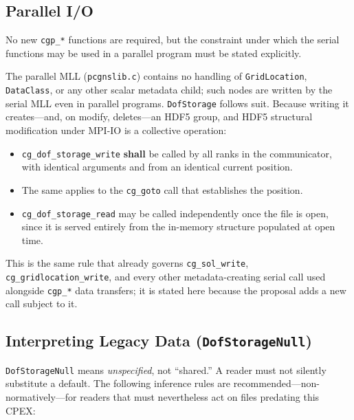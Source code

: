 \documentclass[11pt,letterpaper]{article}
\begin{document}
\subsection{Parallel I/O}

No new \texttt{cgp\_*} functions are required, but the constraint under
which the serial functions may be used in a parallel program must be
stated explicitly.

The parallel MLL (\texttt{pcgnslib.c}) contains no handling of
\texttt{GridLocation}, \texttt{DataClass}, or any other scalar metadata
child; such nodes are written by the serial MLL even in parallel
programs.  \texttt{DofStorage} follows suit.  Because writing it
creates---and, on modify, deletes---an HDF5 group, and HDF5 structural
modification under MPI-IO is a collective operation:

\begin{itemize}[leftmargin=2em]
\item \texttt{cg\_dof\_storage\_write} \textbf{shall} be called by all
  ranks in the communicator, with identical arguments and from an
  identical current position.
\item The same applies to the \texttt{cg\_goto} call that establishes
  the position.
\item \texttt{cg\_dof\_storage\_read} may be called independently once
  the file is open, since it is served entirely from the in-memory
  structure populated at open time.
\end{itemize}

This is the same rule that already governs \texttt{cg\_sol\_write},
\texttt{cg\_gridlocation\_write}, and every other metadata-creating
serial call used alongside \texttt{cgp\_*} data transfers; it is stated
here because the proposal adds a new call subject to it.

\subsection{Interpreting Legacy Data (\texttt{DofStorageNull})}
\label{sec:legacy-inference}

\texttt{DofStorageNull} means \emph{unspecified}, not ``shared.''  A
reader must not silently substitute a default.  The following
inference rules are recommended---non-normatively---for readers that
must nevertheless act on files predating this CPEX:
\end{document}
